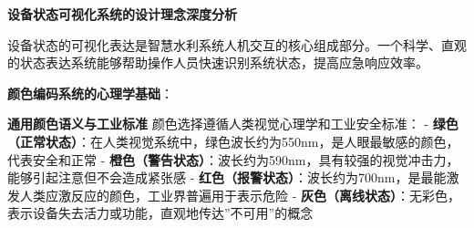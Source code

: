 \begin{Shaded}
\begin{Highlighting}[]
        \OperatorTok{;}
\NormalTok{    \}}
    
        \OperatorTok{=} \NormalTok{[status]}\OperatorTok{;}
        \OperatorTok{=} \NormalTok{()}\OperatorTok{;}
        
        \OperatorTok{=} \NormalTok{)}\OperatorTok{;}
\OperatorTok{;}
        
        \OperatorTok{=} \NormalTok{)}\OperatorTok{;}
\OperatorTok{;}
        
        \OperatorTok{===}  \OperatorTok{||}\OperatorTok{===} \NormalTok{) \{}
            \OperatorTok{;}
\NormalTok{        \}}
        
        \OperatorTok{;}
\NormalTok{    \}}
\NormalTok{\}}
\end{Highlighting}
\end{Shaded}

\textbf{设备状态可视化系统的设计理念深度分析}

设备状态的可视化表达是智慧水利系统人机交互的核心组成部分。一个科学、直观的状态表达系统能够帮助操作人员快速识别系统状态，提高应急响应效率。

\textbf{颜色编码系统的心理学基础}：

\textbf{通用颜色语义与工业标准} 颜色选择遵循人类视觉心理学和工业安全标准： - \textbf{绿色（正常状态）}：在人类视觉系统中，绿色波长约为550nm，是人眼最敏感的颜色，代表安全和正常 - \textbf{橙色（警告状态）}：波长约为590nm，具有较强的视觉冲击力，能够引起注意但不会造成紧张感 - \textbf{红色（报警状态）}：波长约为700nm，是最能激发人类应激反应的颜色，工业界普遍用于表示危险 - \textbf{灰色（离线状态）}：无彩色，表示设备失去活力或功能，直观地传达''不可用''的概念


